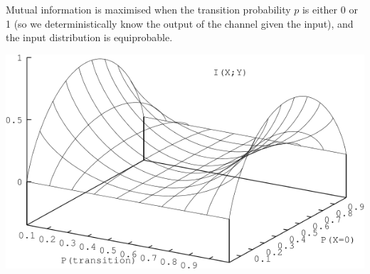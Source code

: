 \documentclass[a4paper, 11pt]{article}
\begin{document}
{\begin{minipage}[t]{0.6\textwidth}
    Mutual information is maximised when the transition probability \(p\) is either 0 or 1 (so we deterministically know the output of the channel given the input), and the input distribution is equiprobable.
    \end{minipage}
    \begin{minipage}[t]{0.35\textwidth}
    \vspace{0pt}
    \centering
    \includegraphics[width=\textwidth]{symmetric-channel.png}
    \end{minipage}
}
\end{document}
